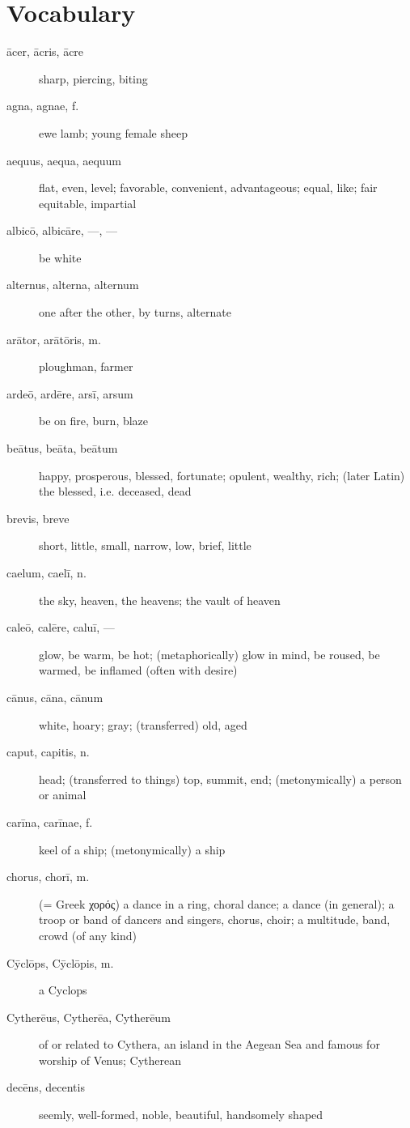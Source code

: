 \chapter*{Vocabulary}

\begin{description}
    \item[ācer, ācris, ācre] sharp, piercing, biting
    \item[agna, agnae, f.] ewe lamb; young female sheep
    \item[aequus, aequa, aequum] flat, even, level; favorable, convenient, advantageous; equal, like; fair equitable, impartial
    \item[albicō, albicāre, ---, ---] be white
    \item[alternus, alterna, alternum] one after the other, by turns, alternate
    \item[arātor, arātōris, m.] ploughman, farmer
    \item[ardeō, ardēre, arsī, arsum] be on fire, burn, blaze
    \item[beātus, beāta, beātum] happy, prosperous, blessed, fortunate; opulent, wealthy, rich; (later Latin) the blessed, i.e. deceased, dead
    \item[brevis, breve] short, little, small, narrow, low, brief, little
    \item[caelum, caelī, n.] the sky, heaven, the heavens; the vault of heaven
    \item[caleō, calēre, caluī, ---] glow, be warm, be hot; (metaphorically) glow in mind, be roused, be warmed, be inflamed (often with desire)
    \item[cānus, cāna, cānum] white, hoary; gray; (transferred) old, aged
    \item[caput, capitis, n.] head; (transferred to things) top, summit, end; (metonymically) a person or animal
    \item[carīna, carīnae, f.] keel of a ship; (metonymically) a ship 
    \item[chorus, chorī, m.] (= Greek χορός) a dance in a ring, choral dance; a dance (in general); a troop or band of dancers and singers, chorus, choir; a multitude, band, crowd (of any kind)
    \item[Cȳclōps, Cȳclōpis, m.] a Cyclops
    \item[Cytherēus, Cytherēa, Cytherēum] of or related to Cythera, an island in the Aegean Sea and famous for worship of Venus; Cytherean
    \item[decēns, decentis] seemly, well-formed, noble, beautiful, handsomely shaped

\end{description}
